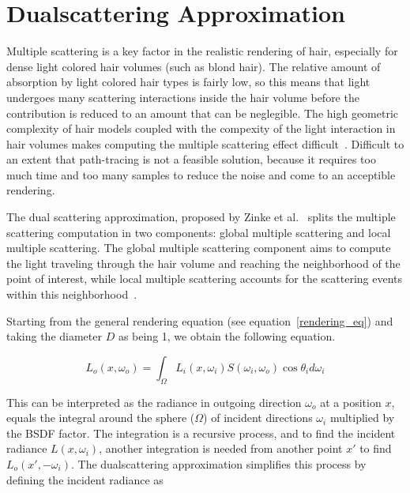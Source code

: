 \section{Dualscattering Approximation}
\label{sec_dualscattering}

Multiple scattering is a key factor in the realistic rendering of hair, especially for dense light colored hair volumes (such as blond hair). The relative amount of absorption by light colored hair types is fairly low, so this means that light undergoes many scattering interactions inside the hair volume before the contribution is reduced to an amount that can be neglegible. The high geometric complexity of hair models coupled with the compexity of the light interaction in hair volumes makes computing the multiple scattering effect difficult~\cite{zinke}. Difficult to an extent that path-tracing is not a feasible solution, because it requires too much time and too many samples to reduce the noise and come to an acceptible rendering.

The dual scattering approximation, proposed by Zinke et al.~\cite{zinke} splits the multiple scattering computation in two components: global multiple scattering and local multiple scattering. The global multiple scattering component aims to compute the light traveling through the hair volume and reaching the neighborhood of the point of interest, while local multiple scattering accounts for the scattering events within this neighborhood~\cite{zinke}.

%
%

Starting from the general rendering equation (see equation~\ref{rendering_eq}) and taking the diameter $D$ as being 1, we obtain the following equation.

\begin{equation}
L_o(x, \omega_o) = \int_{\Omega} L_i(x, \omega_i) S(\omega_i, \omega_o) \cos \theta_i d\omega_i
\end{equation}

This can be interpreted as the radiance in outgoing direction $\omega_o$ at a position $x$, equals the integral around the sphere ($\Omega$) of incident directions $\omega_i$ multiplied by the BSDF factor. The integration is a recursive process, and to find the incident radiance $L(x, \omega_i)$, another integration is needed from another point $x'$ to find $L_o(x', -\omega_i)$. The dualscattering approximation simplifies this process by defining the incident radiance as

